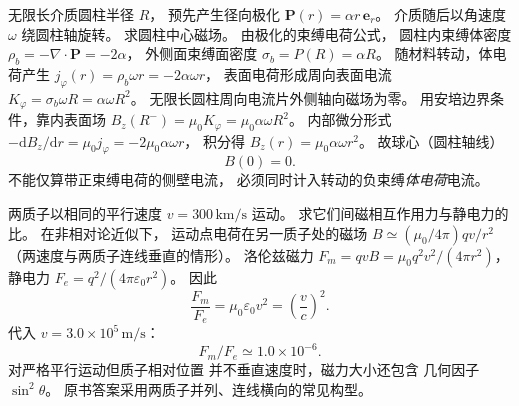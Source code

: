 无限长介质圆柱半径 $R$，
预先产生径向极化
$\bm P(r)=\alpha r\,\bm e_r$。
介质随后以角速度 $\omega$
绕圆柱轴旋转。
求圆柱中心磁场。
\exsolution
由极化的束缚电荷公式，
圆柱内束缚体密度
$\rho_b=-\nabla\cdot\bm P=-2\alpha$，
外侧面束缚面密度
$\sigma_b=P(R)=\alpha R$。
随材料转动，体电荷产生
$j_\varphi(r)=\rho_b\omega r=-2\alpha\omega r$，
表面电荷形成周向表面电流
$K_\varphi=\sigma_b\omega R=\alpha\omega R^2$。
无限长圆柱周向电流片外侧轴向磁场为零。
用安培边界条件，靠内表面场
$B_z(R^-)=\mu_0K_\varphi
=\mu_0\alpha\omega R^2$。
内部微分形式
$-\mathrm dB_z/\mathrm dr
=\mu_0j_\varphi=-2\mu_0\alpha\omega r$，
积分得
$B_z(r)=\mu_0\alpha\omega r^2$。
故球心（圆柱轴线）
\[
\boxed{B(0)=0}.
\]
\excheck 不能仅算带正束缚电荷的侧壁电流，
必须同时计入转动的负束缚\emph{体电荷}电流。

两质子以相同的平行速度
$v=300\,\mathrm{km/s}$ 运动。
求它们间磁相互作用力与静电力的比。
\exsolution
在非相对论近似下，
运动点电荷在另一质子处的磁场
$B\simeq(\mu_0/4\pi)qv/r^2$
（两速度与两质子连线垂直的情形）。
洛伦兹磁力
$F_m=qvB=\mu_0q^2v^2/(4\pi r^2)$，
静电力
$F_e=q^2/(4\pi\varepsilon_0r^2)$。
因此
\[
\boxed{\frac{F_m}{F_e}=
\mu_0\varepsilon_0v^2
=\left(\frac vc\right)^2}.
\]
代入 $v=3.0\times10^5\,\mathrm{m/s}$：
\[
\boxed{F_m/F_e\simeq1.0\times10^{-6}}.
\]
\excheck 对严格平行运动但质子相对位置
并不垂直速度时，磁力大小还包含
几何因子 $\sin^2\theta$。
原书答案采用两质子并列、连线横向的常见构型。
